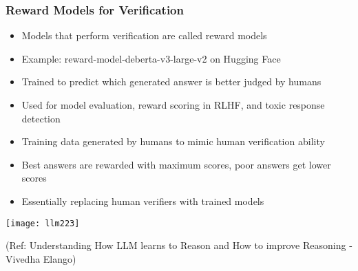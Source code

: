 \begin{frame}[fragile]\frametitle{Reward Models for Verification}
      \begin{itemize}
        \item Models that perform verification are called reward models
        \item Example: reward-model-deberta-v3-large-v2 on Hugging Face
        \item Trained to predict which generated answer is better judged by humans
        \item Used for model evaluation, reward scoring in RLHF, and toxic response detection
        \item Training data generated by humans to mimic human verification ability
        \item Best answers are rewarded with maximum scores, poor answers get lower scores
        \item Essentially replacing human verifiers with trained models
      \end{itemize}
	  
        \begin{center}
        \texttt{[image: llm223]}
		
		{\tiny (Ref: Understanding How LLM learns to Reason and How to improve Reasoning - Vivedha Elango)}
        \end{center}		  
\end{frame}

